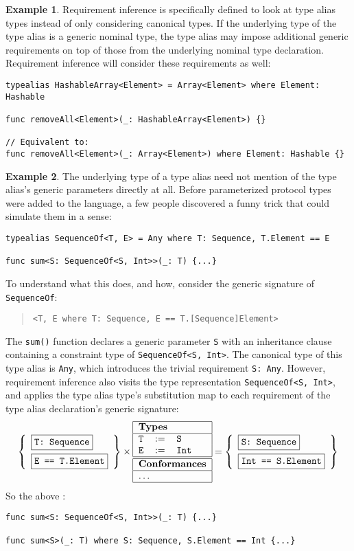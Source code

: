 \documentclass[a4paper,headsepline,bibliography=totoc,toc=flat,fleqn,twoside=semi]{scrbook}
\theoremstyle{definition}
\theoremstyle{definition}
\newtheorem{example}{Example}[chapter]
\theoremstyle{definition}
\newcommand{\ttbox}[1]{\boxed{\mbox{\vphantom{pI\texttt{pI}}\texttt{#1}}}}
\newcommand{\SubMapC}[2]{\begin{tabular}{|lll|}
\hline
\multicolumn{3}{|l|}{\textbf{Types}}\\
\hline
#1\\
\hline
\hline
\multicolumn{3}{|l|}{\textbf{Conformances}}\\
\hline
#2\\
\hline
\end{tabular}}
\newcommand{\SubType}[2]{\texttt{#1}&$:=$&\texttt{#2}}
\begin{document}
\begin{example}
Requirement inference is specifically defined to look at type alias types instead of only considering canonical types. If the underlying type of the type alias is a generic nominal type, the type alias may impose additional generic requirements on top of those from the underlying nominal type declaration. Requirement inference will consider these requirements as well:
\begin{Verbatim}
typealias HashableArray<Element> = Array<Element> where Element: Hashable

func removeAll<Element>(_: HashableArray<Element>) {}

// Equivalent to:
func removeAll<Element>(_: Array<Element>) where Element: Hashable {}
\end{Verbatim}
\end{example}
\begin{example}
The underlying type of a type alias need not mention of the type alias's generic parameters directly at all. Before parameterized protocol types were added to the language, a few people discovered a funny trick that could simulate them in a sense:
\begin{Verbatim}
typealias SequenceOf<T, E> = Any where T: Sequence, T.Element == E

func sum<S: SequenceOf<S, Int>>(_: T) {...}
\end{Verbatim}
To understand what this does, and how, consider the generic signature of \texttt{SequenceOf}:
\begin{quote}
\begin{verbatim}
<T, E where T: Sequence, E == T.[Sequence]Element>
\end{verbatim}
\end{quote}
The \texttt{sum()} function declares a generic parameter \texttt{S} with an inheritance clause containing a constraint type of \texttt{SequenceOf<S, Int>}. The canonical type of this type alias is \texttt{Any}, which introduces the trivial requirement \texttt{S:\ Any}. However, requirement inference also visits the type representation \texttt{SequenceOf<S, Int>}, and applies the type alias type's substitution map to each requirement of the type alias declaration's generic signature:
\[
\left\{
\begin{array}{l}
\ttbox{T:\ Sequence}\\[\medskipamount]
\ttbox{E == T.Element}
\end{array}
\right\}
\times
\SubMapC{
\SubType{T}{S}\\
\SubType{E}{Int}
}{\multicolumn{3}{|l|}{$\ldots$}} =
\left\{
\begin{array}{l}
\ttbox{S:\ Sequence}\\[\medskipamount]
\ttbox{Int == S.Element}
\end{array}
\right\}
\]
So the above :
\begin{Verbatim}
func sum<S: SequenceOf<S, Int>>(_: T) {...}

func sum<S>(_: T) where S: Sequence, S.Element == Int {...}
\end{Verbatim}
\end{example}
\end{document}
